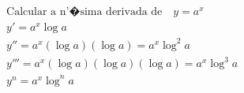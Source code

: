 \begin{ex}
\begin{align}
&\text{Calcular a n'�sima derivada de}\quad y=a^{x}\nonumber\\
&y'=a^{x}\log{a}\nonumber\\
&y''=a^{x}(\log{a})(\log{a})=a^{x}\log^2{a}\nonumber\\
&y'''=a^{x}(\log{a})(\log{a})(\log{a})=a^{x}\log^3{a}\nonumber\\
&y^{n}=a^{x}\log^{n}{a}\nonumber
\end{align}
\end{ex}
